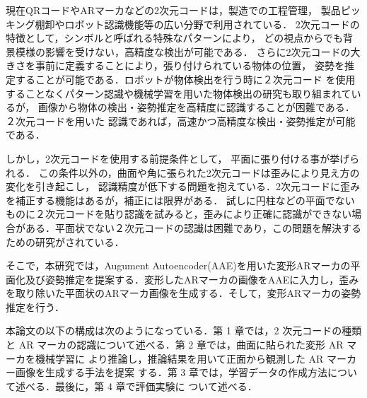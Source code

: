 現在QRコードやARマーカなどの2次元コードは，製造での工程管理，
製品ピッキング棚卸やロボット認識機能等の広い分野で利用されている．
2次元コードの特徴として，シンボルと呼ばれる特殊なパターンにより，
どの視点からでも背景模様の影響を受けない，高精度な検出が可能である．
さらに2次元コードの大きさを事前に定義することにより，張り付けられている物体の位置，
姿勢を推定することが可能である．ロボットが物体検出を行う時に２次元コード
を使用することなくパターン認識や機械学習を用いた物体検出の研究も取り組まれているが，
画像から物体の検出・姿勢推定を高精度に認識することが困難である．２次元コードを用いた
認識であれば，高速かつ高精度な検出・姿勢推定が可能である．

しかし，2次元コードを使用する前提条件として，
平面に張り付ける事が挙げられる．
この条件以外の，曲面や角に張られた2次元コードは歪みにより見え方の変化を引き起こし，
認識精度が低下する問題を抱えている．2次元コードに歪みを補正する機能はあるが，補正には限界がある．
試しに円柱などの平面でないものに２次元コードを貼り認識を試みると，歪みにより正確に認識ができない場合がある．平面状でない２次元コードの認識は困難であり，この問題を解決するための研究がされている．

そこで，本研究では，Augument Autoencoder(AAE)を用いた変形ARマーカの平面化及び姿勢推定を提案する．変形したARマーカの画像をAAEに入力し，歪みを取り除いた平面状のARマーカ画像を生成する．そして，変形ARマーカの姿勢推定を行う．


本論文の以下の構成は次のようになっている．第 1 章では，2 次元コードの種類と AR
マーカの認識について述べる．第 2 章では，曲面に貼られた変形 AR マーカを機械学習に
より推論し，推論結果を用いて正面から観測した AR マーカー画像を生成する手法を提案
する．第 3 章では，学習データの作成方法について述べる．最後に，第 4 章で評価実験に
ついて述べる．